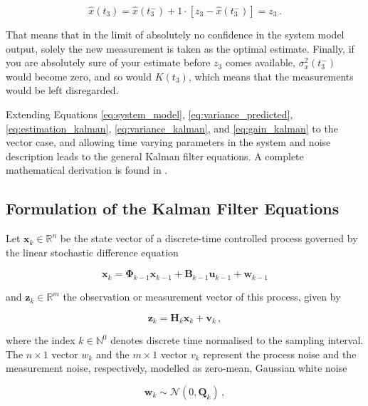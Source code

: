 \begin{equation}\label{eq:prediction_kalman}
  \hat{x}(t_3) = \hat{x}(t^-_3) + 1 \cdot [z_3-\hat{x}(t^-_3)] = z_3\,.
\end{equation}

\noindent
That means that in the limit of absolutely no confidence in the system model output, solely the new measurement is taken as the optimal estimate. Finally, if you are absolutely sure of your estimate before $z_3$ comes available, $\sigma^2_x(t^-_3)$ would become zero, and so would $K(t_3)$, which means that the measurements would be left disregarded. 

Extending Equations \ref{eq:system_model}, \ref{eq:variance_predicted}, \ref{eq:estimation_kalman}, \ref{eq:variance_kalman}, and \ref{eq:gain_kalman} to the vector case, and allowing time varying parameters in the system and noise description leads to the general Kalman filter equations. A complete mathematical derivation is found in \citeauthor{haykin2002adaptive} \cite{haykin2002adaptive}.

\subsection{Formulation of the Kalman Filter Equations} \label{sec:Kalman_equations}

Let $\mathbf{x}_k \in \mathbb{R}^n$ be the state vector of a discrete-time controlled process governed by the linear stochastic difference equation 

\begin{equation}\label{eq:time_dynamical_system_plant}
  \mathbf{x}_k = \bm{\Phi}_{k-1}\mathbf{x}_{k-1}+\mathbf{B}_{k-1}\mathbf{u}_{k-1}+\mathbf{w}_{k-1}
\end{equation}

\noindent
and $\mathbf{z}_k \in \mathbb{R}^m$ the observation or measurement vector of this process, given by

\begin{equation}\label{eq:time_dynamical_system_measurement}
  \mathbf{z}_k = \mathbf{H}_{k}\mathbf{x}_{k}+\mathbf{v}_{k}\,,
\end{equation}

\noindent
where the index $k \in \mathbb{N}^0$ denotes discrete time normalised to the sampling interval. The $n\times1$ vector $w_k$ and the $m\times1$ vector $v_k$ represent the process noise and the measurement noise, respectively, modelled as zero-mean, Gaussian white noise

\begin{equation}\label{eq:process_noise}
  \mathbf{w}_{k} \sim \mathcal{N}(0,\mathbf{Q}_k)\,,
\end{equation}

